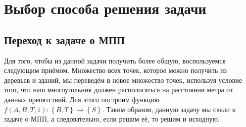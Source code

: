 \documentclass[a4paper,12pt]{article}
\begin{document}
\newpage

\section{Выбор способа решения задачи} {
\subsection{Переход к задаче о МПП}
Для того, чтобы из данной задачи получить более общую, воспользуемся следующим приёмом. Множество всех точек, которое можно получить из деревьев и зданий, мы переведём в новое множество точек, используя условие того, что наш многоугольник должен распологаться на расстоянии метра от данных препятствий. Для этого построим функцию $f(A, B, T, 1) : \left\{B,T\right\} \rightarrow \left\{S\right\}$. Таким образом, данную задачу мы свели к задаче о МПП, а следовательно, если решим её, то решим и исходную.
}
\end{document}
